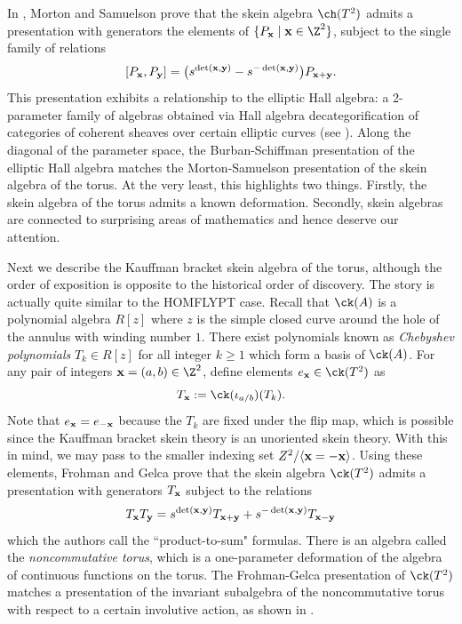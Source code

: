 In , Morton and Samuelson prove that the skein algebra $\ch(T^2)$ admits a presentation with generators the elements of $\{ P_\xx \mid \xx \in \Z^2 \}$, subject to the single family of relations 
\[
[P_{\mathbf{x}}, P_{\mathbf{y}}] = \big( s^{\det({\mathbf{x}},{\mathbf{y}})} - s^{-\det({\mathbf{x}},{\mathbf{y}})} \big) P_{{\mathbf{x}} + {\mathbf{y}}}.
\]
This presentation exhibits a relationship to the elliptic Hall algebra: a 2-parameter family of algebras obtained via Hall algebra decategorification of categories of coherent sheaves over certain elliptic curves (see ). Along the diagonal of the parameter space, the Burban-Schiffman presentation of the elliptic Hall algebra matches the Morton-Samuelson presentation of the skein algebra of the torus. At the very least, this highlights two things. Firstly, the skein algebra of the torus admits a known deformation. Secondly, skein algebras are connected to surprising areas of mathematics and hence deserve our attention. 

Next we describe the Kauffman bracket skein algebra of the torus, although the order of exposition is opposite to the historical order of discovery. The story is actually quite similar to the HOMFLYPT case. Recall that $\ck(A)$ is a polynomial algebra $R[z]$ where $z$ is the simple closed curve around the hole of the annulus with winding number $1$. There exist polynomials known as \textit{Chebyshev polynomials} $T_k \in R[z]$ for all integer $k \geq 1$ which form a basis of $\ck(A)$. For any pair of integers $\xx = (a, b) \in \Z^2$, define elements $e_\xx \in \ck(T^2)$ as 
\[
T_\xx := \ck(\iota_{a/b})(T_k).
\]
Note that $e_{\mathbf{x}} = e_{-{\mathbf{x}}}$ because the $T_k$ are fixed under the flip map, which is possible since the Kauffman bracket skein theory is an unoriented skein theory. With this in mind, we may pass to the smaller indexing set $Z^2 / \langle {\mathbf{x}} = -{\mathbf{x}} \rangle$. Using these elements, Frohman and Gelca  prove that the skein algebra $\ck(T^2)$ admits a presentation with generators $T_{\mathbf{x}}$ subject to the relations
\[
T_{\mathbf{x}} T_{\mathbf{y}} = s^{\det({\mathbf{x}}, {\mathbf{y}})} T_{{\mathbf{x}} + {\mathbf{y}}} + s^{-\det({\mathbf{x}}, {\mathbf{y}})} T_{{\mathbf{x}} - {\mathbf{y}}}
\]
which the authors call the ``product-to-sum" formulas. There is an algebra called the \textit{noncommutative torus}, which is a one-parameter deformation of the algebra of continuous functions on the torus. The Frohman-Gelca presentation of $\ck(T^2)$ matches a presentation of the invariant subalgebra of the noncommutative torus with respect to a certain involutive action, as shown in . 


